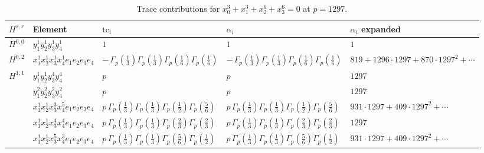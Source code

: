 \documentclass[11pt]{article}
\begin{document}
\begin{table}[ht]
\centering
\caption{Trace contributions for $x_0^{3} + x_1^{3} + x_2^{6} + x_3^{6} = 0$ at $p=1297$.}\label{tab:diagonal-12}
\renewcommand{\arraystretch}{1.1}
{\scriptsize
\begin{tabular}{@{}lllll@{}}
\toprule
$H^{s,r}$ & Element & $\mathrm{tc}_i$ & $\alpha_i$ & $\alpha_i$ expanded \\
\midrule
$H^{0,0}$ & $y_{1}^{1} y_{2}^{1} y_{3}^{1} y_{4}^{1}$ & $1$ & $1$ & $1$ \\
\midrule
$H^{0,2}$ & $x_{1}^{1} x_{2}^{1} x_{3}^{1} x_{4}^{1}  e_{1} e_{2} e_{3} e_{4}$ & $- \, \Gamma_p \left( \frac{1}{3} \right) \Gamma_p \left( \frac{1}{3} \right) \Gamma_p \left( \frac{1}{6} \right) \Gamma_p \left( \frac{1}{6} \right)$ & $- \, \Gamma_p \left( \frac{1}{3} \right) \Gamma_p \left( \frac{1}{3} \right) \Gamma_p \left( \frac{1}{6} \right) \Gamma_p \left( \frac{1}{6} \right)$ & $819{+}1296{\cdot}1297{+}870{\cdot}1297^{2}{+}\cdots$ \\
\midrule
$H^{1,1}$ & $y_{1}^{1} y_{2}^{1} y_{3}^{4} y_{4}^{4}$ & $p \,$ & $p \,$ & $1297$ \\
 & $y_{1}^{2} y_{2}^{2} y_{3}^{2} y_{4}^{2}$ & $p \,$ & $p \,$ & $1297$ \\
 & $x_{1}^{1} x_{2}^{1} x_{3}^{3} x_{4}^{5}  e_{1} e_{2} e_{3} e_{4}$ & $p \, \Gamma_p \left( \frac{1}{3} \right) \Gamma_p \left( \frac{1}{3} \right) \Gamma_p \left( \frac{1}{2} \right) \Gamma_p \left( \frac{5}{6} \right)$ & $p \, \Gamma_p \left( \frac{1}{3} \right) \Gamma_p \left( \frac{1}{3} \right) \Gamma_p \left( \frac{1}{2} \right) \Gamma_p \left( \frac{5}{6} \right)$ & $931{\cdot}1297{+}409{\cdot}1297^{2}{+}\cdots$ \\
 & $x_{1}^{1} x_{2}^{1} x_{3}^{4} x_{4}^{4}  e_{1} e_{2} e_{3} e_{4}$ & $p \, \Gamma_p \left( \frac{1}{3} \right) \Gamma_p \left( \frac{1}{3} \right) \Gamma_p \left( \frac{2}{3} \right) \Gamma_p \left( \frac{2}{3} \right)$ & $p \, \Gamma_p \left( \frac{1}{3} \right) \Gamma_p \left( \frac{1}{3} \right) \Gamma_p \left( \frac{2}{3} \right) \Gamma_p \left( \frac{2}{3} \right)$ & $1297$ \\
 & $x_{1}^{1} x_{2}^{1} x_{3}^{5} x_{4}^{3}  e_{1} e_{2} e_{3} e_{4}$ & $p \, \Gamma_p \left( \frac{1}{3} \right) \Gamma_p \left( \frac{1}{3} \right) \Gamma_p \left( \frac{5}{6} \right) \Gamma_p \left( \frac{1}{2} \right)$ & $p \, \Gamma_p \left( \frac{1}{3} \right) \Gamma_p \left( \frac{1}{3} \right) \Gamma_p \left( \frac{5}{6} \right) \Gamma_p \left( \frac{1}{2} \right)$ & $931{\cdot}1297{+}409{\cdot}1297^{2}{+}\cdots$ \\

\end{tabular}}
\end{table}
\end{document}
